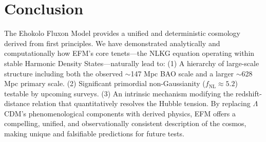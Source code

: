 \documentclass[11pt]{article}
\begin{document}
\section{Conclusion}
The Ehokolo Fluxon Model provides a unified and deterministic cosmology derived from first principles. We have demonstrated analytically and computationally how EFM's core tenets—the NLKG equation operating within stable Harmonic Density States—naturally lead to: (1) A hierarchy of large-scale structure including both the observed \(\sim\)147 Mpc BAO scale and a larger \(\sim\)628 Mpc primary scale. (2) Significant primordial non-Gaussianity (\(f_{\text{NL}} \approx 5.2\)) testable by upcoming surveys. (3) An intrinsic mechanism modifying the redshift-distance relation that quantitatively resolves the Hubble tension. By replacing \(\Lambda\)CDM's phenomenological components with derived physics, EFM offers a compelling, unified, and observationally consistent description of the cosmos, making unique and falsifiable predictions for future tests.


\appendix
\end{document}
